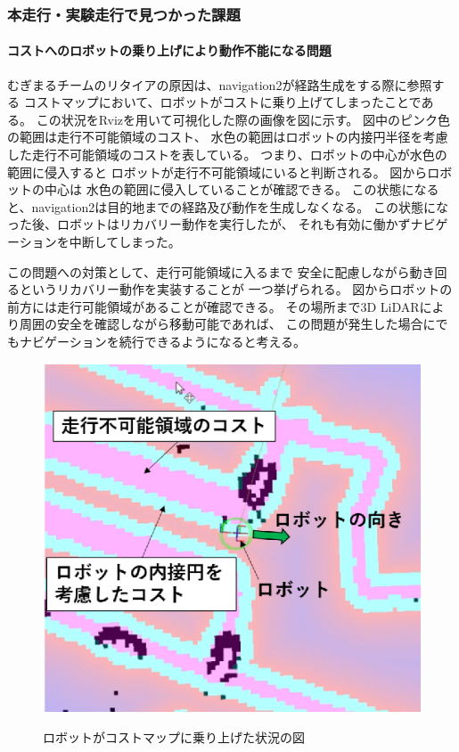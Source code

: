 \subsubsection{本走行・実験走行で見つかった課題}
\paragraph{コストへのロボットの乗り上げにより動作不能になる問題}
むぎまるチームのリタイアの原因は、navigation2が経路生成をする際に参照する
コストマップにおいて、ロボットがコストに乗り上げてしまったことである。
この状況をRvizを用いて可視化した際の画像を図\label{fig:mugimaru_result}に示す。
図中のピンク色の範囲は走行不可能領域のコスト、
水色の範囲はロボットの内接円半径を考慮した走行不可能領域のコストを表している。
つまり、ロボットの中心が水色の範囲に侵入すると
ロボットが走行不可能領域にいると判断される。
図\label{fig:mugimaru_result}からロボットの中心は
水色の範囲に侵入していることが確認できる。
この状態になると、navigation2は目的地までの経路及び動作を生成しなくなる。
この状態になった後、ロボットはリカバリー動作を実行したが、
それも有効に働かずナビゲーションを中断してしまった。

この問題への対策として、走行可能領域に入るまで
安全に配慮しながら動き回るというリカバリー動作を実装することが
一つ挙げられる。
図からロボットの前方には走行可能領域があることが確認できる。
その場所まで3D LiDARにより周囲の安全を確認しながら移動可能であれば、
この問題が発生した場合にでもナビゲーションを続行できるようになると考える。
\begin{figure}[h]
  \centering
  \includegraphics[width=0.9\linewidth]{figs/mugimaru_result.eps}
  \label{fig:mugimaru_result}
  \caption{ロボットがコストマップに乗り上げた状況の図} 
\end{figure}


